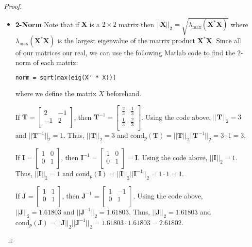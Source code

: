\documentclass[12pt]{article}
\theoremstyle{definition}
\newcommand{\vect}[1]{\boldsymbol{#1}}
\begin{document}
\begin{proof}
\begin{itemize}
    \item \textbf{2-Norm} Note that if $\vect{X}$ is a $2 \times 2$ matrix then
      $||\vect{X}||_2 = \sqrt {\lambda_{\max}(\vect{X^*} \vect{X})}$ where
      $\lambda_{\max}(\vect{X}^*\vect{X})$ is the largest eigenvalue of the matrix
      product $\vect{X}^*\vect{X}$. Since all of our matrices our real, we can use the
      following Matlab code to find the 2-norm of each matrix:
      \begin{verbatim}norm = sqrt(max(eig(X' * X)))\end{verbatim}
      where we define the matrix $X$ beforehand.

      If $\vect{T} = \begin{bmatrix}2 & -1 \\ -1 & 2 \\\end{bmatrix}$, then
      $\vect{T}^{-1} = \begin{bmatrix}\frac{2}{3} & \frac{1}{3} \\ \frac{1}{3} & \frac{2}{3} \\\end{bmatrix}$.
      Using the code above, $||\vect{T}||_2 = 3$ and $||\vect{T}^{-1}||_2 =1.$
      Thus, $||\vect{T}||_2 = 3$ and $\text{cond}_p(\vect{T}) = ||\vect{T}||_2 ||\vect{T}^{-1}||_2 = 3 \cdot 1 = 3$.

      If $\vect{I} = \begin{bmatrix}1 & 0 \\ 0 & 1 \\\end{bmatrix}$, then
      $\vect{I}^{-1} = \begin{bmatrix}1 & 0 \\ 0 & 1\\\end{bmatrix} = \vect{I}$.
      Using the code above, $||\vect{I}||_2 = 1$.
      Thus, $||\vect{I}||_2 = 1$ and $\text{cond}_p(\vect{I}) = ||\vect{I}||_2 ||\vect{I}^{-1}||_2 = 1 \cdot 1 = 1$.

      If $\vect{J} = \begin{bmatrix}1 & 1 \\ 0 & 1 \\\end{bmatrix}$, then
      $\vect{J}^{-1} = \begin{bmatrix}1 & -1 \\ 0 & 1 \\\end{bmatrix}$.
      Using the code above, $||\vect{J}||_2 = 1.61803$ and $||\vect{J}^{-1}||_2 =1.61803.$
      Thus, $||\vect{J}||_2 = 1.61803$ and $\text{cond}_p(\vect{J}) = ||\vect{J}||_2 ||\vect{J}^{-1}||_2 = 1.61803 \cdot 1.61803 = 2.61802$.


\end{itemize}
\end{proof}
\end{document}
